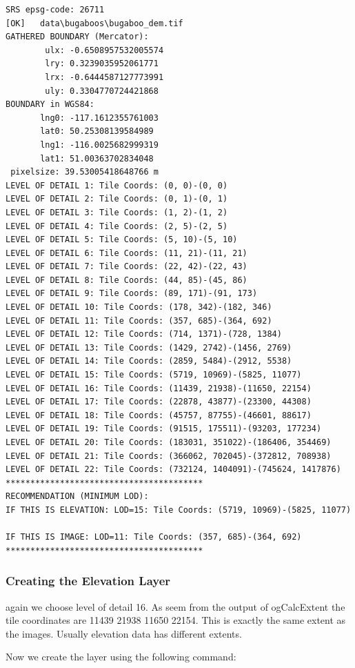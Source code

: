 \documentclass[
	12pt,
	a4paper,
	english,	
	appendixprefix,				     			        
	openany,		     	
	abstracton,		    		    
 	BCOR8mm,		    
]{scrartcl}
\begin{document}
\begin{lstlisting}
SRS epsg-code: 26711
[OK]   data\bugaboos\bugaboo_dem.tif
GATHERED BOUNDARY (Mercator):
        ulx: -0.6508957532005574
        lry: 0.3239035952061771
        lrx: -0.6444587127773991
        uly: 0.3304770724421868
BOUNDARY in WGS84:
       lng0: -117.1612355761003
       lat0: 50.25308139584989
       lng1: -116.0025682999319
       lat1: 51.00363702834048
 pixelsize: 39.53005418648766 m
LEVEL OF DETAIL 1: Tile Coords: (0, 0)-(0, 0)
LEVEL OF DETAIL 2: Tile Coords: (0, 1)-(0, 1)
LEVEL OF DETAIL 3: Tile Coords: (1, 2)-(1, 2)
LEVEL OF DETAIL 4: Tile Coords: (2, 5)-(2, 5)
LEVEL OF DETAIL 5: Tile Coords: (5, 10)-(5, 10)
LEVEL OF DETAIL 6: Tile Coords: (11, 21)-(11, 21)
LEVEL OF DETAIL 7: Tile Coords: (22, 42)-(22, 43)
LEVEL OF DETAIL 8: Tile Coords: (44, 85)-(45, 86)
LEVEL OF DETAIL 9: Tile Coords: (89, 171)-(91, 173)
LEVEL OF DETAIL 10: Tile Coords: (178, 342)-(182, 346)
LEVEL OF DETAIL 11: Tile Coords: (357, 685)-(364, 692)
LEVEL OF DETAIL 12: Tile Coords: (714, 1371)-(728, 1384)
LEVEL OF DETAIL 13: Tile Coords: (1429, 2742)-(1456, 2769)
LEVEL OF DETAIL 14: Tile Coords: (2859, 5484)-(2912, 5538)
LEVEL OF DETAIL 15: Tile Coords: (5719, 10969)-(5825, 11077)
LEVEL OF DETAIL 16: Tile Coords: (11439, 21938)-(11650, 22154)
LEVEL OF DETAIL 17: Tile Coords: (22878, 43877)-(23300, 44308)
LEVEL OF DETAIL 18: Tile Coords: (45757, 87755)-(46601, 88617)
LEVEL OF DETAIL 19: Tile Coords: (91515, 175511)-(93203, 177234)
LEVEL OF DETAIL 20: Tile Coords: (183031, 351022)-(186406, 354469)
LEVEL OF DETAIL 21: Tile Coords: (366062, 702045)-(372812, 708938)
LEVEL OF DETAIL 22: Tile Coords: (732124, 1404091)-(745624, 1417876)
****************************************
RECOMMENDATION (MINIMUM LOD):
IF THIS IS ELEVATION: LOD=15: Tile Coords: (5719, 10969)-(5825, 11077)

IF THIS IS IMAGE: LOD=11: Tile Coords: (357, 685)-(364, 692)
****************************************
\end{lstlisting}

\subsubsection{Creating the Elevation Layer}

again we choose level of detail 16. As seem from the output of ogCalcExtent the tile coordinates are 11439 21938 11650 22154. This is exactly the same extent as the images. Usually elevation data has different extents. 

Now we create the layer using the following command:
\end{document}
